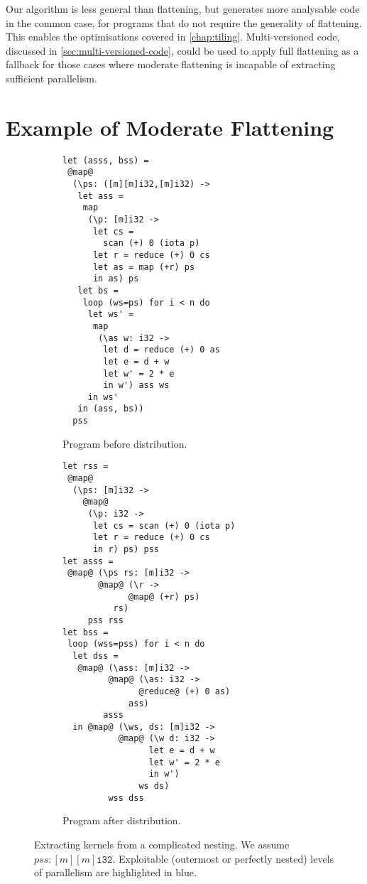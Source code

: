 Our algorithm is less general than flattening, but generates more
analysable code in the common case, for programs that do not require
the generality of flattening.  This enables the optimisations covered
in \cref{chap:tiling}.  Multi-versioned code, discussed in
\cref{sec:multi-versioned-code}, could be used to apply full
flattening as a fallback for those cases where moderate flattening is
incapable of extracting sufficient parallelism.

\section{Example of Moderate Flattening}
\label{sec:kernel-extraction}

\begin{figure}
\begin{subfigure}[b]{0.48\columnwidth}
\begin{lstlisting}[basicstyle=\scriptsize\ttfamily,numbers=none,xleftmargin=0pt,moredelim={[is][\color{blue}\bfseries]{@}{@}}]
let (asss, bss) =
 @map@
  (\ps: ([m][m]i32,[m]i32) ->
   let ass =
    map
     (\p: [m]i32 ->
      let cs =
        scan (+) 0 (iota p)
      let r = reduce (+) 0 cs
      let as = map (+r) ps
      in as) ps
   let bs =
    loop (ws=ps) for i < n do
     let ws' =
      map
       (\as w: i32 ->
        let d = reduce (+) 0 as
        let e = d + w
        let w' = 2 * e
        in w') ass ws
     in ws'
   in (ass, bs))
  pss
\end{lstlisting}
\caption{Program before distribution.}
\label{fig:before-distrib}
\end{subfigure}
\hfill
\begin{subfigure}[b]{0.49\columnwidth}
\begin{lstlisting}[basicstyle=\scriptsize\ttfamily,numbers=none,xleftmargin=0pt,moredelim={[is][\color{blue}\bfseries]{@}{@}}]
let rss =
 @map@
  (\ps: [m]i32 ->
    @map@
     (\p: i32 ->
      let cs = scan (+) 0 (iota p)
      let r = reduce (+) 0 cs
      in r) ps) pss
let asss =
 @map@ (\ps rs: [m]i32 ->
       @map@ (\r ->
             @map@ (+r) ps)
          rs)
     pss rss
let bss =
 loop (wss=pss) for i < n do
  let dss =
   @map@ (\ass: [m]i32 ->
         @map@ (\as: i32 ->
               @reduce@ (+) 0 as)
             ass)
        asss
  in @map@ (\ws, ds: [m]i32 ->
           @map@ (\w d: i32 ->
                 let e = d + w
                 let w' = 2 * e
                 in w')
               ws ds)
         wss dss
\end{lstlisting}
\caption{Program after distribution.}
\label{fig:after-result}
\end{subfigure}
\caption{Extracting kernels from a complicated nesting.  We assume
  $pss : [m][m]\texttt{i32}$.  Exploitable (outermost or perfectly
  nested) levels of parallelism are highlighted in blue.}
\end{figure}

